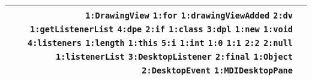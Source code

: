 \documentclass[]{article}
\begin{document}
\begin{minipage}{\textwidth}
\begin{tabular}{rp{12.5cm}}
	        \verb|1:DrawingView|\newline
	        \verb|1:for|\newline
	        \verb|1:drawingViewAdded|\newline
	        \verb|2:dv|\newline
	        \verb|1:getListenerList|\newline
	        \verb|4:dpe|\newline
	        \verb|2:if|\newline
	        \verb|1:class|\newline
	        \verb|3:dpl|\newline
	        \verb|1:new|\newline
	        \verb|1:void|\newline
	        \verb|4:listeners|\newline
	        \verb|1:length|\newline
	        \verb|1:this|\newline
	        \verb|5:i|\newline
	        \verb|1:int|\newline
	        \verb|1:0|\newline
	        \verb|1:1|\newline
	        \verb|2:2|\newline
	        \verb|2:null|\newline
	        \verb|1:listenerList|\newline
	        \verb|3:DesktopListener|\newline
	        \verb|2:final|\newline
	        \verb|1:Object|\newline
	        \verb|2:DesktopEvent|\newline
	        \verb|1:MDIDesktopPane|\newline \\
			\bottomrule[2pt]
		\end{tabular}
	\end{minipage}\\\\
	
\end{document}
